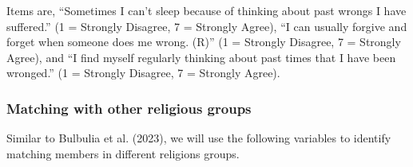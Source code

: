 \documentclass[
]{interact}
\begin{document}
Items are, ``Sometimes I can't sleep because of thinking about past
wrongs I have suffered.'' (1 = Strongly Disagree, 7 = Strongly Agree),
``I can usually forgive and forget when someone does me wrong. (R)'' (1
= Strongly Disagree, 7 = Strongly Agree), and ``I find myself regularly
thinking about past times that I have been wronged.'' (1 = Strongly
Disagree, 7 = Strongly Agree).

\subsubsection{Matching with other religious
groups}\label{matching-with-other-religious-groups}

Similar to Bulbulia et al. (2023), we will use the following variables
to identify matching members in different religions groups.
\end{document}
